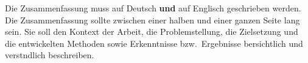 \documentclass[
     12pt,         %
     a4paper,      %
     BCOR10mm,     %
     DIV14,        %
     ]{scrreprt}
\begin{document}

Die Zusammenfassung muss auf Deutsch \textbf{und} auf Englisch geschrieben
werden. Die Zusammenfassung sollte zwischen einer halben und einer
ganzen Seite lang sein. Sie soll den Kontext der Arbeit, die
Problemstellung, die Zielsetzung und die entwickelten Methoden sowie
Erkenntnisse bzw.~Ergebnisse bersichtlich und verstndlich
beschreiben.
\end{document}
